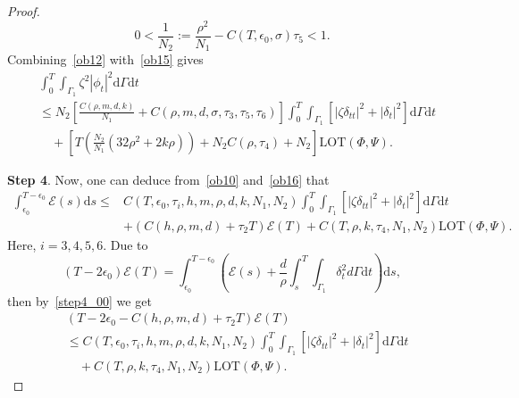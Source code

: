 \documentclass[10pt]{elsarticle}
\begin{document}
\begin{proof}
\[
0<\frac{1}{N_2}:=\frac{\rho^2}{N_1} - C(T, \epsilon_0, \sigma)\tau_5<1.
\]
Combining~\eqref{ob12} with~\eqref{ob15} gives
 \begin{equation}\label{ob16}
\begin{split}
&\int_{0}^{T}\int_{\Gamma_1}\zeta^2|\phi_t|^2 \mathrm{d}\Gamma \mathrm{d}t \\
&\leqslant N_2\left[\frac{C(\rho, m, d, k)}{N_1} + C(\rho, m, d, \sigma, \tau_3,  \tau_5, \tau_6)\right]\int_{0}^{T}\int_{\Gamma_1}\left[|\zeta \delta_{tt}|^2 +|\delta_t|^2 \right]\mathrm{d}\Gamma \mathrm{d}t \\
&\quad+\left[ T\left(\frac{N_2}{N_1}\left(32\rho^2+2k\rho\right)\right)+N_2C(\rho, \tau_4)+N_2\right] \textrm{LOT}(\Phi, \Psi).
\end{split}
\end{equation}

\textbf{Step 4}. Now, one can deduce from~\eqref{ob10} and~\eqref{ob16} that
\begin{equation}\label{step4_00}
\begin{split}
\int_{\epsilon_0}^{T-\epsilon_0}\mathcal{E}(s)\mathrm{d}s \leqslant &C(T, \epsilon_0, \tau_i, h, m, \rho, d, k, N_1, N_2)\int_{0}^{T}\int_{\Gamma_1}\left[|\zeta \delta_{tt}|^2 +|\delta_t|^2 \right]\mathrm{d}\Gamma \mathrm{d}t \\
&+\left(C(h, \rho, m, d)+\tau_2 T\right)\mathcal{E}(T) +C(T, \rho, k, \tau_4, N_1, N_2)\textrm{LOT}(\Phi, \Psi).
\end{split}
\end{equation}
Here, $i=3, 4, 5, 6$.
Due to
\begin{equation*}
(T-2\epsilon_0)\mathcal{E}(T) = \int_{\epsilon_0}^{T-\epsilon_0}\left(\mathcal{E}(s) +\frac{d}{\rho}\int_{s}^{T}\int_{\Gamma_1}\delta_{t}^2d\Gamma \mathrm{d}t\right)\mathrm{d}s,
\end{equation*}
then by~\eqref{step4_00} we get
\begin{equation}\label{step4_01}
\begin{split}
&(T-2\epsilon_0 - C(h, \rho, m, d)+\tau_2 T)\mathcal{E}(T) \\
&\leqslant C(T, \epsilon_0, \tau_i, h, m, \rho, d, k, N_1, N_2)\int_{0}^{T}\int_{\Gamma_1}\left[|\zeta \delta_{tt}|^2 +|\delta_t|^2 \right]\mathrm{d}\Gamma \mathrm{d}t \\
&\quad +C(T, \rho, k, \tau_4, N_1, N_2)\textrm{LOT}(\Phi, \Psi).
\end{split}
\end{equation}


\end{proof}
\end{document}
